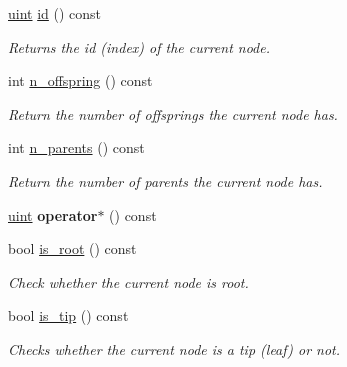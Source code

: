 \begin{DoxyCompactItemize}
\hyperlink{namespacepruner_a659e6e64a9e2b8e981c3d34262a2f67e}{uint} \hyperlink{classpruner_1_1TreeIterator_aa0d37262febc59a1b229e98ce610b30a}{id} () const
\begin{DoxyCompactList}\small\item\em Returns the id (index) of the current node. \end{DoxyCompactList}\item 
\mbox{\label{classpruner_1_1TreeIterator_a0c472982f19ce786b1804604630e8b70}} 
int \hyperlink{classpruner_1_1TreeIterator_a0c472982f19ce786b1804604630e8b70}{n\+\_\+offspring} () const
\begin{DoxyCompactList}\small\item\em Return the number of offsprings the current node has. \end{DoxyCompactList}\item 
\mbox{\label{classpruner_1_1TreeIterator_a719b54a7943b2c0f558f28f08b5034b1}} 
int \hyperlink{classpruner_1_1TreeIterator_a719b54a7943b2c0f558f28f08b5034b1}{n\+\_\+parents} () const
\begin{DoxyCompactList}\small\item\em Return the number of parents the current node has. \end{DoxyCompactList}\item 
\mbox{\label{classpruner_1_1TreeIterator_a9095b84a476df16d83ae5ac26bd06351}} 
\hyperlink{namespacepruner_a659e6e64a9e2b8e981c3d34262a2f67e}{uint} {\bfseries operator$\ast$} () const
\item 
\mbox{\label{classpruner_1_1TreeIterator_a4cfe6295bd7c8d1ca57c76882cdad7d8}} 
bool \hyperlink{classpruner_1_1TreeIterator_a4cfe6295bd7c8d1ca57c76882cdad7d8}{is\+\_\+root} () const
\begin{DoxyCompactList}\small\item\em Check whether the current node is root. \end{DoxyCompactList}\item 
\mbox{\label{classpruner_1_1TreeIterator_a5ea48c035ffa01b98842d043d22f6e76}} 
bool \hyperlink{classpruner_1_1TreeIterator_a5ea48c035ffa01b98842d043d22f6e76}{is\+\_\+tip} () const
\begin{DoxyCompactList}\small\item\em Checks whether the current node is a tip (leaf) or not. \end{DoxyCompactList}\item 

\end{DoxyCompactItemize}
